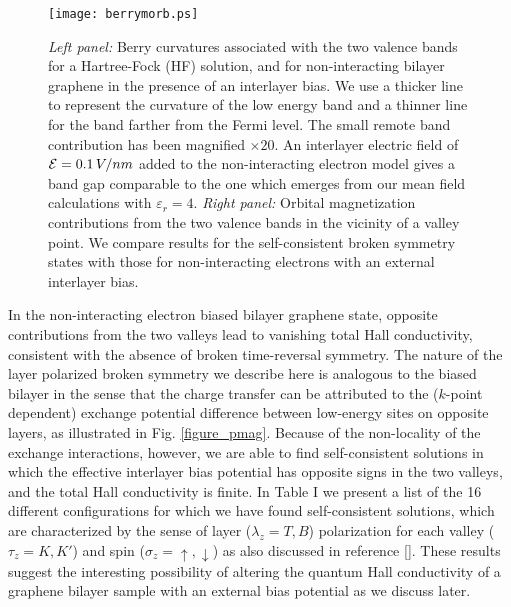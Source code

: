 \documentclass[twocolumn,prb,showpacs,preprintnumbers,amsmath,amssymb]{revtex4}
\begin{document}
\begin{figure}[htbp]
\begin{center}
\texttt{[image: berrymorb.ps]} 
\caption{
{\em Left panel:}
Berry curvatures associated with the two valence bands for a Hartree-Fock (HF)
solution, and for non-interacting bilayer graphene in the presence of an interlayer bias.
We use a thicker line to represent the curvature of the low energy
band and a thinner line for the band farther from the Fermi level.
The small remote band contribution has been magnified $\times 20$. 
An interlayer electric field of ${\cal E} = 0.1 \, V/nm$ added to the non-interacting 
electron model gives a band gap comparable to the one
which emerges from our mean field calculations with $\varepsilon_r = 4$.
{\em Right panel:}
Orbital magnetization contributions from the two valence bands
in the vicinity of a valley point. 
We compare results for the self-consistent broken
symmetry states with those for non-interacting electrons with an
external interlayer bias.
}
\label{orbmag}
\end{center}
\end{figure}
In the non-interacting electron biased bilayer graphene state,
opposite contributions from the two valleys lead to vanishing total Hall conductivity,
consistent with the absence of broken time-reversal symmetry.
The nature of the layer polarized broken symmetry we describe here
is analogous to the biased bilayer in the sense that the charge transfer 
can be attributed to the ($k$-point dependent) 
exchange potential difference between low-energy sites on opposite layers, as illustrated in Fig. \ref{figure_pmag}.
Because of the non-locality of the exchange interactions, however, we are able to find 
self-consistent solutions in which the effective interlayer bias potential has 
opposite signs in the two valleys, and the total Hall conductivity is finite.  
In Table I we present a list of the 16 different configurations for which we have 
found self-consistent solutions, which are characterized by the 
sense of layer ($\lambda_z = T, B$) polarization for each valley ($\tau_z = K, K'$) and spin ($\sigma_z = \uparrow, \downarrow$)
as also discussed in reference [].
These results suggest the interesting possibility of altering the quantum Hall 
conductivity of a graphene bilayer sample with an external bias potential as we discuss later.
\end{document}
